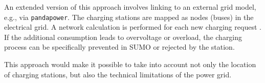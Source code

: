 An extended version of this approach involves linking to an external grid model, e.g., via \texttt{pandapower}. The charging stations are mapped as nodes (buses) in the electrical grid. A network calculation is performed for each new charging request \cite{noauthor_pandapower_nodate, noauthor_about_nodate}. If the additional consumption leads to overvoltage or overload, the charging process can be specifically prevented in SUMO or rejected by the station.

This approach would make it possible to take into account not only the location of charging stations, but also the technical limitations of the power grid.

